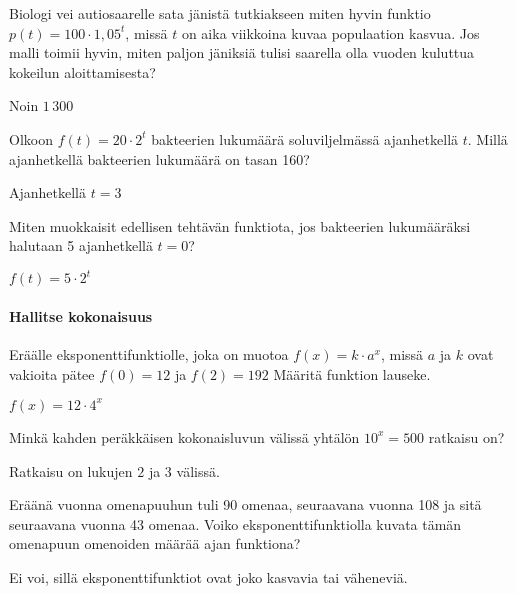 \begin{tehtavasivu}
\begin{tehtava}
Biologi vei autiosaarelle sata jänistä tutkiakseen miten hyvin funktio $ p(t)=100 \cdot 1,05^{t}$, missä $t$ on aika viikkoina kuvaa populaation kasvua. Jos malli toimii hyvin, miten paljon jäniksiä tulisi saarella olla vuoden kuluttua kokeilun aloittamisesta?
\begin{vastaus}
Noin $1\,300$
\end{vastaus}
\end{tehtava}

\begin{tehtava}
Olkoon $f(t) = 20 \cdot 2^t$ bakteerien lukumäärä soluviljelmässä
ajanhetkellä $t$. Millä ajanhetkellä bakteerien lukumäärä on tasan 160?
\begin{vastaus}
Ajanhetkellä $t=3$ %
\end{vastaus}
\end{tehtava}

\begin{tehtava}
Miten muokkaisit edellisen tehtävän funktiota, jos bakteerien lukumääräksi
halutaan 5 ajanhetkellä $t = 0$?
\begin{vastaus}
$f(t) = 5 \cdot 2^t$
\end{vastaus}
\end{tehtava}

\paragraph*{Hallitse kokonaisuus}

\begin{tehtava}
Eräälle eksponenttifunktiolle, joka on muotoa $ f(x)=k\cdot a^{x}  $, missä $ a $ ja $ k $ ovat vakioita pätee $ f(0)=12 $ ja $ f(2)=192 $ Määritä funktion lauseke.
\begin{vastaus}
$f(x)=12\cdot 4^{x}$
\end{vastaus}
\end{tehtava}


\begin{tehtava}
Minkä kahden peräkkäisen kokonaisluvun välissä yhtälön
$10^x = 500$ ratkaisu on?
\begin{vastaus}
Ratkaisu on lukujen $2$ ja $3$ välissä.
\end{vastaus}
\end{tehtava}


\begin{tehtava}
Eräänä vuonna omenapuuhun tuli 90 omenaa, seuraavana vuonna 108 ja sitä seuraavana vuonna 43 omenaa. Voiko eksponenttifunktiolla kuvata tämän omenapuun omenoiden määrää ajan funktiona?
\begin{vastaus}
Ei voi, sillä eksponenttifunktiot ovat joko kasvavia tai väheneviä.
\end{vastaus}
\end{tehtava}


\end{tehtavasivu}

